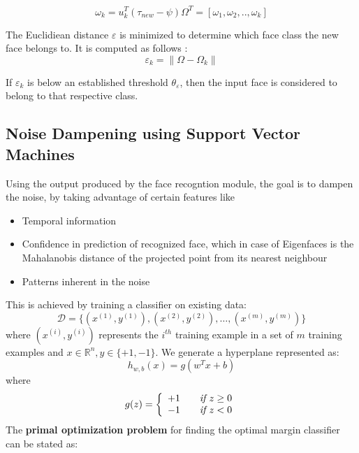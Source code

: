 \documentclass[%
        final,
        notitlepage,
        narroweqnarray,
        inline,
        ]{ieee}
\begin{document}
\begin{equation}
\omega_{k} = u_{k}^{T}(\tau_{new} - \psi)	\Omega^{T} = [\omega_{1},\omega_{2},..,\omega_{k}] 
\end{equation}

The Euclidiean distance $\varepsilon$ is minimized to determine which face class the new face belongs to. It is computed as follows \cite{eigtut}:
\begin{equation}
\varepsilon_{k} = \parallel\Omega - \Omega_{k}\parallel 
\end{equation}

If $\varepsilon_{k}$ is below an established threshold $\theta_{\varepsilon}$, then the input face is considered to belong to that respective class.


\subsection{Noise Dampening using Support Vector Machines}
Using the output produced by the face recogntion module, the goal is to dampen the noise, by taking advantage of certain features like
\begin{itemize}
	\item Temporal information
	\item Confidence in prediction of recognized face, which in case of Eigenfaces is the Mahalanobis distance of the projected point from its nearest neighbour
	\item Patterns inherent in the noise
\end{itemize}
This is achieved by training a classifier on existing data:
\begin{equation}
\mathcal {D} = \{(x^{(1)},y^{(1)}),(x^{(2)},y^{(2)}),\ldots,(x^{(m)},y^{(m)})\}
\end{equation}
where $(x^{(i)}, y^{(i)})$ represents the $i^{th}$ training example in a set of $m$ training examples and $x \in \mathbb{R}^n, y \in \{+1, -1\}$. We generate a hyperplane represented as:
\begin{equation}
h_{w,b}(x) = g(w^Tx + b)
\end{equation}
where
\begin{equation}
g(z) = \left\{
\begin{array}{l l}
+1 & \quad \textit{if $z \geq 0$}\\
-1 & \quad \textit{if $z < 0$}\\
\end{array} \right.
\end{equation}
The \textbf{primal optimization problem} for finding the optimal margin classifier can be stated as:
\end{document}
